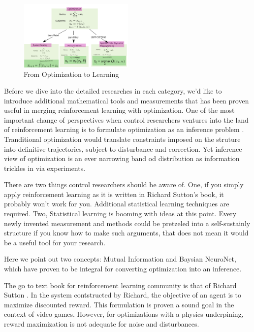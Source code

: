 \documentclass[journal]{IEEEtran}
\begin{document}
\begin{figure}[H]
    \centering
    \includegraphics[width=0.5\textwidth]{Control.png}
    \caption{From Optimization to Learning}
    \label{fig:1}
\end{figure}

Before we dive into the detailed researches in each category, we'd like to introduce additional mathematical tools and measurements that has been proven useful in merging reinforcement learning with optimization. One of the most important change of perspectives when control researchers ventures into the land of reinforcement learning is to formulate optimization as an inference problem \cite{Levine2018ReinforcementLA}. Tranditional optimization would translate constraints imposed on the struture into definitive trajectories, subject to disturbance and correction. Yet inference view of optimization is an ever narrowing band od distribution as information trickles in via experiments.

There are two things control researchers should be aware of. One, if you simply apply reinforcement learning as it is written in Richard Sutton's book, it probably won't work for you. Additional statistical learning techniques are required. Two, Statistical learning is booming with ideas at this point. Every newly invented measurement and methods could be pretzeled into a self-sustainly structure if you know how to make such arguments, that does not mean it would be a useful tool for your research.

Here we point out two concepts: Mutual Information and Baysian NeuroNet, which have proven to be integral for converting optimization into an inference.

The go to text book for reinforcement learning community is that of Richard Sutton \cite{Sutton1998IntroductionTR}. In the system contstructed by Richard, the objective of an agent is to maximize discounted reward. This formulation is proven a sound goal in the context of video games. However, for optimizations with a physics underpining, reward maximization is not adequate for noise and disturbances.
\end{document}
